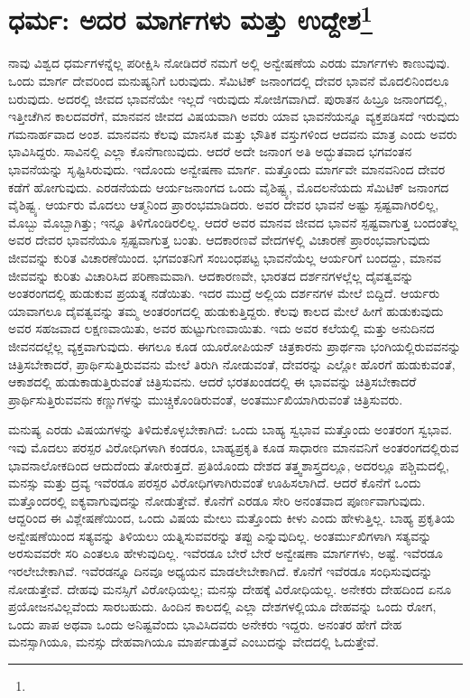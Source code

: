 
\chapter[ಧರ್ಮ: ಅದರ ಮಾರ್ಗಗಳು ಮತ್ತು ಉದ್ದೇಶ]{ಧರ್ಮ: ಅದರ ಮಾರ್ಗಗಳು ಮತ್ತು ಉದ್ದೇಶ\protect\footnote{}}

ನಾವು ವಿಶ್ವದ ಧರ್ಮಗಳನ್ನೆಲ್ಲ ಪರೀಕ್ಷಿಸಿ ನೋಡಿದರೆ ನಮಗೆ ಅಲ್ಲಿ ಅನ್ವೇಷಣೆಯ ಎರಡು ಮಾರ್ಗಗಳು ಕಾಣುವುವು. ಒಂದು ಮಾರ್ಗ ದೇವರಿಂದ ಮನುಷ್ಯನಿಗೆ ಬರುವುದು. ಸೆಮಿಟಿಕ್ ಜನಾಂಗದಲ್ಲಿ ದೇವರ ಭಾವನೆ ಮೊದಲಿನಿಂದಲೂ ಬರುವುದು. ಅದರಲ್ಲಿ ಜೀವದ ಭಾವನೆಯೇ ಇಲ್ಲದೆ ಇರುವುದು ಸೋಜಿಗವಾಗಿದೆ. ಪುರಾತನ ಹಿಬ್ರೂ ಜನಾಂಗದಲ್ಲಿ, ಇತ್ತೀಚೆಗಿನ ಕಾಲದವರೆಗೆ, ಮಾನವನ ಜೀವದ ವಿಷಯವಾಗಿ ಅವರು ಯಾವ ಭಾವನೆಯನ್ನೂ ವ್ಯಕ್ತಪಡಿಸದೆ ಇರುವುದು ಗಮನಾರ್ಹವಾದ ಅಂಶ. ಮಾನವನು ಕೆಲವು ಮಾನಸಿಕ ಮತ್ತು ಭೌತಿಕ ವಸ್ತುಗಳಿಂದ ಆದವನು ಮಾತ್ರ ಎಂದು ಅವರು ಭಾವಿಸಿದ್ದರು. ಸಾವಿನಲ್ಲಿ ಎಲ್ಲಾ ಕೊನೆಗಾಣುವುದು. ಆದರೆ ಅದೇ ಜನಾಂಗ ಅತಿ ಅದ್ಭುತವಾದ ಭಗವಂತನ ಭಾವನೆಯನ್ನು ಸೃಷ್ಟಿಸಿರುವುದು. ಇದೊಂದು ಅನ್ವೇಷಣಾ ಮಾರ್ಗ. ಮತ್ತೊಂದು ಮಾರ್ಗವೇ ಮಾನವನಿಂದ ದೇವರ ಕಡೆಗೆ ಹೋಗುವುದು. ಎರಡನೆಯದು ಆರ್ಯಜನಾಂಗದ ಒಂದು ವೈಶಿಷ್ಟ್ಯ, ಮೊದಲನೆಯದು ಸೆಮಿಟಿಕ್ ಜನಾಂಗದ ವೈಶಿಷ್ಟ್ಯ. ಆರ್ಯರು ಮೊದಲು ಆತ್ಮನಿಂದ ಪ್ರಾರಂಭಮಾಡಿದರು. ಅವರ ದೇವರ ಭಾವನೆ ಅಷ್ಟು ಸ್ಪಷ್ಟವಾಗಿರಲಿಲ್ಲ, ಮೊಬ್ಬು ಮೊಬ್ಬಾಗಿತ್ತು; ಇನ್ನೂ ತಿಳಿಗೊಂಡಿರಲಿಲ್ಲ. ಆದರೆ ಅವರ ಮಾನವ ಜೀವದ ಭಾವನೆ ಸ್ಪಷ್ಟವಾಗುತ್ತ ಬಂದಂತೆಲ್ಲ ಅವರ ದೇವರ ಭಾವನೆಯೂ ಸ್ಪಷ್ಟವಾಗುತ್ತ ಬಂತು. ಆದಕಾರಣವೆ ವೇದಗಳಲ್ಲಿ ವಿಚಾರಣೆ ಪ್ರಾರಂಭವಾಗುವುದು ಜೀವವನ್ನು ಕುರಿತ ವಿಚಾರಣೆಯಿಂದ. ಭಗವಂತನಿಗೆ ಸಂಬಂಧಪಟ್ಟ ಭಾವನೆಯೆಲ್ಲ ಆರ್ಯರಿಗೆ ಬಂದದ್ದು, ಮಾನವ ಜೀವವನ್ನು ಕುರಿತು ವಿಚಾರಿಸಿದ ಪರಿಣಾಮವಾಗಿ. ಆದಕಾರಣವೇ, ಭಾರತದ ದರ್ಶನಗಳಲ್ಲೆಲ್ಲ ದೈವತ್ವವನ್ನು ಅಂತರಂಗದಲ್ಲಿ ಹುಡುಕುವ ಪ್ರಯತ್ನ ನಡೆಯಿತು. ಇದರ ಮುದ್ರೆ ಅಲ್ಲಿಯ ದರ್ಶನಗಳ ಮೇಲೆ ಬಿದ್ದಿದೆ. ಆರ್ಯರು ಯಾವಾಗಲೂ ದೈವತ್ವವನ್ನು ತಮ್ಮ ಅಂತರಂಗದಲ್ಲಿ ಹುಡುಕುತ್ತಿದ್ದರು. ಕೆಲವು ಕಾಲದ ಮೇಲೆ ಹೀಗೆ ಹುಡುಕುವುದು ಅವರ ಸಹಜವಾದ ಲಕ್ಷಣವಾಯಿತು, ಅವರ ಹುಟ್ಟುಗುಣವಾಯಿತು. ಇದು ಅವರ ಕಲೆಯಲ್ಲಿ ಮತ್ತು ಅನುದಿನದ ಜೀವನದಲ್ಲೆಲ್ಲ ವ್ಯಕ್ತವಾಗುವುದು. ಈಗಲೂ ಕೂಡ ಯೂರೋಪಿಯನ್ ಚಿತ್ರಕಾರನು ಪ್ರಾರ್ಥನಾ ಭಂಗಿಯಲ್ಲಿರುವವನನ್ನು ಚಿತ್ರಿಸಬೇಕಾದರೆ, ಪ್ರಾರ್ಥಿಸುತ್ತಿರುವವನು ಮೇಲೆ ತಿರುಗಿ ನೋಡುವಂತೆ, ದೇವರನ್ನು ಎಲ್ಲೋ ಹೊರಗೆ ಹುಡುಕುವಂತೆ, ಆಕಾಶದಲ್ಲಿ ಹುಡುಕಾಡುತ್ತಿರುವಂತೆ ಚಿತ್ರಿಸುವನು. ಆದರೆ ಭರತಖಂಡದಲ್ಲಿ ಈ ಭಾವವನ್ನು ಚಿತ್ರಿಸಬೇಕಾದರೆ ಪ್ರಾರ್ಥಿಸುತ್ತಿರುವವನು ಕಣ್ಣುಗಳನ್ನು ಮುಚ್ಚಿಕೊಂಡಿರುವಂತೆ, ಅಂತರ್ಮುಖಿಯಾಗಿರುವಂತೆ ಚಿತ್ರಿಸುವರು.

ಮನುಷ್ಯ ಎರಡು ವಿಷಯಗಳನ್ನು ತಿಳಿದುಕೊಳ್ಳಬೇಕಾಗಿದೆ: ಒಂದು ಬಾಹ್ಯ ಸ್ವಭಾವ ಮತ್ತೊಂದು ಅಂತರಂಗ ಸ್ವಭಾವ. ಇವು ಮೊದಲು ಪರಸ್ಪರ ವಿರೋಧಿಗಳಾಗಿ ಕಂಡರೂ, ಬಾಹ್ಯಪ್ರಕೃತಿ ಕೂಡ ಸಾಧಾರಣ ಮಾನವನಿಗೆ ಅಂತರಂಗದಲ್ಲಿರುವ ಭಾವನಾಲೋಕದಿಂದ ಆದುದೆಂದು ತೋರುತ್ತದೆ. ಪ್ರತಿಯೊಂದು ದೇಶದ ತತ್ತ್ವಶಾಸ್ತ್ರದಲ್ಲೂ, ಅದರಲ್ಲೂ ಪಶ್ಚಿಮದಲ್ಲಿ, ಮನಸ್ಸು ಮತ್ತು ದ್ರವ್ಯ ಇವೆರಡೂ ಪರಸ್ಪರ ವಿರೋಧಿಗಳಾಗಿರುವಂತೆ ಊಹಿಸಲಾಗಿದೆ. ಆದರೆ ಕೊನೆಗೆ ಒಂದು ಮತ್ತೊಂದರಲ್ಲಿ ಐಕ್ಯವಾಗುವುದನ್ನು ನೋಡುತ್ತೇವೆ. ಕೊನೆಗೆ ಎರಡೂ ಸೇರಿ ಅನಂತವಾದ ಪೂರ್ಣವಾಗುವುದು. ಆದ್ದರಿಂದ ಈ ವಿಶ್ಲೇಷಣೆಯಿಂದ, ಒಂದು ವಿಷಯ ಮೇಲು ಮತ್ತೊಂದು ಕೀಳು ಎಂದು ಹೇಳುತ್ತಿಲ್ಲ. ಬಾಹ್ಯ ಪ್ರಕೃತಿಯ ಅನ್ವೇಷಣೆಯಿಂದ ಸತ್ಯವನ್ನು ತಿಳಿಯಲು ಯತ್ನಿಸುವವರನ್ನು ತಪ್ಪು ಎನ್ನುವುದಿಲ್ಲ. ಅಂತರ್ಮುಖಿಗಳಾಗಿ ಸತ್ಯವನ್ನು ಅರಸುವವರೇ ಸರಿ ಎಂತಲೂ ಹೇಳುವುದಿಲ್ಲ. ಇವೆರಡೂ ಬೇರೆ ಬೇರೆ ಅನ್ವೇಷಣಾ ಮಾರ್ಗಗಳು, ಅಷ್ಟೆ. ಇವೆರಡೂ ಇರಲೇಬೇಕಾಗಿವೆ. ಇವೆರಡನ್ನೂ ದಿನವೂ ಅಧ್ಯಯನ ಮಾಡಲೇಬೇಕಾಗಿದೆ. ಕೊನೆಗೆ ಇವೆರಡೂ ಸಂಧಿಸುವುದನ್ನು ನೋಡುತ್ತೇವೆ. ದೇಹವು ಮನಸ್ಸಿಗೆ ವಿರೋಧಿಯಲ್ಲ; ಮನಸ್ಸು ದೇಹಕ್ಕೆ ವಿರೋಧಿಯಲ್ಲ. ಅನೇಕರು ದೇಹದಿಂದ ಏನೂ ಪ್ರಯೋಜನವಿಲ್ಲವೆಂದು ಸಾರಬಹುದು. ಹಿಂದಿನ ಕಾಲದಲ್ಲಿ ಎಲ್ಲಾ ದೇಶಗಳಲ್ಲಿಯೂ ದೇಹವನ್ನು ಒಂದು ರೋಗ, ಒಂದು ಪಾಪ ಅಥವಾ ಒಂದು ಅನಿಷ್ಟವೆಂದು ಭಾವಿಸಿದವರು ಅನೇಕರು ಇದ್ದರು. ಅನಂತರ ಹೇಗೆ ದೇಹ ಮನಸ್ಸಾಗಿಯೂ, ಮನಸ್ಸು ದೇಹವಾಗಿಯೂ ಮಾರ್ಪಡುತ್ತವೆ ಎಂಬುದನ್ನು ವೇದದಲ್ಲಿ ಓದುತ್ತೇವೆ.

